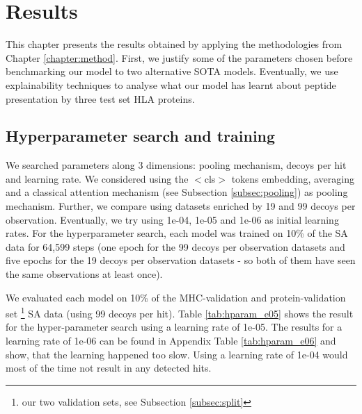 \documentclass[msc,deptreport,ai]{infthesis} %
\begin{document}
\chapter{Results}
\label{chapter:results}
	This chapter presents the results obtained by applying the methodologies from Chapter \ref{chapter:method}. First, we justify some of the parameters chosen before benchmarking our model to two alternative \gls{SOTA} models. Eventually, we use explainability techniques to analyse what our model has learnt about peptide presentation by three test set \gls{HLA} proteins.


	\section{Hyperparameter search and training}
	\label{sec:hypsearch}
		We searched parameters along 3 dimensions: pooling mechanism, decoys per hit and learning rate. We considered using the $<$cls$>$ tokens embedding, averaging and a classical attention mechanism (see Subsection \ref{subsec:pooling}) as pooling mechanism. Further, we compare using datasets enriched by 19 and 99 decoys per observation. Eventually, we try using 1e-04, 1e-05 and 1e-06 as initial learning rates. For the hyperparameter search, each model was trained on 10\% of the \gls{SA} data for 64,599 steps (one epoch for the 99 decoys per observation datasets and five epochs for the 19 decoys per observation datasets - so both of them have seen the same observations at least once).
		
		We evaluated each model on 10\% of the \gls{MHC}-validation and protein-validation set \footnote{our two validation sets, see Subsection \ref{subsec:split}} \gls{SA} data (using 99 decoys per hit). Table \ref{tab:hparam_e05} shows the result for the hyper-parameter search using a learning rate of 1e-05. The results for a learning rate of 1e-06 can be found in Appendix Table \ref{tab:hparam_e06} and show, that the learning happened too slow. Using a learning rate of 1e-04 would most of the time not result in any detected hits.
		
\end{document}
